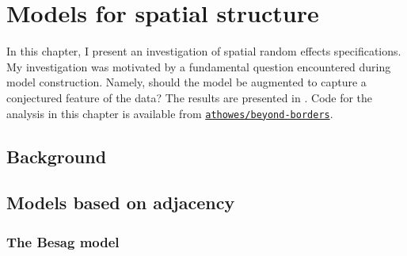 \documentclass[a4paper, nobind]{templates/ociamthesis}
\begin{document}
\hypertarget{beyond-borders}{%
\chapter{Models for spatial structure}\label{beyond-borders}}

\adjustmtc
{}

In this chapter, I present an investigation of spatial random effects specifications.
My investigation was motivated by a fundamental question encountered during model construction.
Namely, should the model be augmented to capture a conjectured feature of the data?
The results are presented in \textcite{howes2023beyond}.
Code for the analysis in this chapter is available from \href{https://github.com/athowes/beyond-borders}{\texttt{athowes/beyond-borders}}.

\hypertarget{background-1}{%
\section{Background}\label{background-1}}

\hypertarget{models-based-on-adjacency}{%
\section{Models based on adjacency}\label{models-based-on-adjacency}}

\hypertarget{the-besag-model}{%
\subsection{The Besag model}\label{the-besag-model}}
\end{document}
